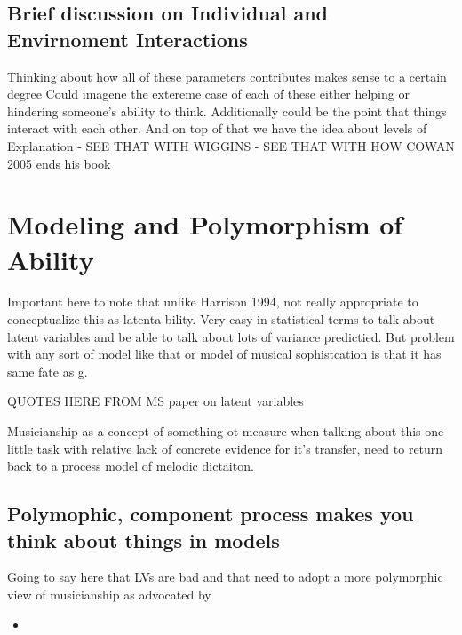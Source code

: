 \documentclass[]{book}
\providecommand{\tightlist}{%
  \setlength{\itemsep}{0pt}\setlength{\parskip}{0pt}}
\theoremstyle{definition}
\theoremstyle{definition}
\theoremstyle{definition}
\theoremstyle{remark}
\begin{document}
\hypertarget{brief-discussion-on-individual-and-envirnoment-interactions}{%
\subsection{Brief discussion on Individual and Envirnoment
Interactions}\label{brief-discussion-on-individual-and-envirnoment-interactions}}

Thinking about how all of these parameters contributes makes sense to a
certain degree Could imagene the extereme case of each of these either
helping or hindering someone's ability to think. Additionally could be
the point that things interact with each other. And on top of that we
have the idea about levels of Explanation - SEE THAT WITH WIGGINS - SEE
THAT WITH HOW COWAN 2005 ends his book

\hypertarget{modeling-and-polymorphism-of-ability}{%
\section{Modeling and Polymorphism of
Ability}\label{modeling-and-polymorphism-of-ability}}

Important here to note that unlike Harrison 1994, not really appropriate
to conceptualize this as latenta bility. Very easy in statistical terms
to talk about latent variables and be able to talk about lots of
variance predictied. But problem with any sort of model like that or
model of musical sophistcation is that it has same fate as g.

QUOTES HERE FROM MS paper on latent variables

Musicianship as a concept of something ot measure when talking about
this one little task with relative lack of concrete evidence for it's
transfer, need to return back to a process model of melodic dictaiton.

\hypertarget{polymophic-component-process-makes-you-think-about-things-in-models}{%
\subsection{Polymophic, component process makes you think about things
in
models}\label{polymophic-component-process-makes-you-think-about-things-in-models}}

Going to say here that LVs are bad and that need to adopt a more
polymorphic view of musicianship as advocated by

\begin{itemize}
\tightlist
\item
  \citep{levitinWhatDoesIt2012, peretzModularityMusicProcessing2003}
\end{itemize}
\end{document}

